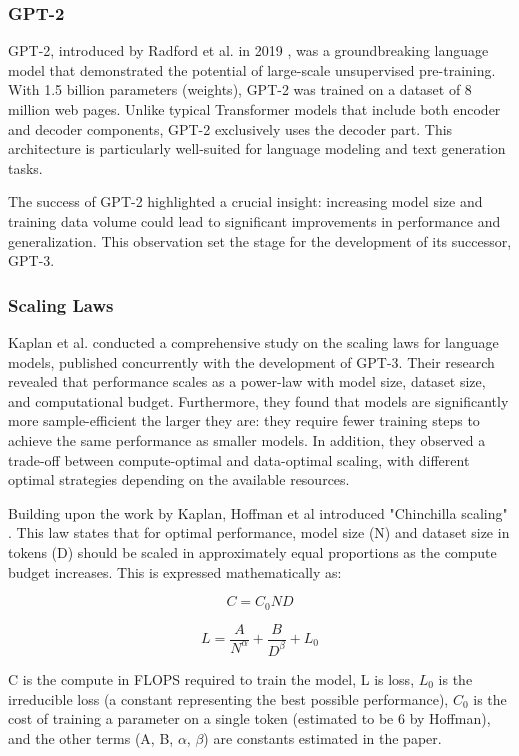 \documentclass[a4paper, oneside]{discothesis}
\begin{document}
\subsubsection{GPT-2}
GPT-2, introduced by Radford et al. in 2019 \cite{radford2019language}, was a groundbreaking language model that demonstrated the potential of large-scale unsupervised pre-training. With 1.5 billion parameters (weights), GPT-2 was trained on a dataset of 8 million web pages. Unlike typical Transformer models that include both encoder and decoder components, GPT-2 exclusively uses the decoder part. This architecture is particularly well-suited for language modeling and text generation tasks.

The success of GPT-2 highlighted a crucial insight: increasing model size and training data volume could lead to significant improvements in performance and generalization. This observation set the stage for the development of its successor, GPT-3.

\subsubsection{Scaling Laws}
Kaplan et al. \cite{kaplan2020scaling} conducted a comprehensive study on the scaling laws for language models, published concurrently with the development of GPT-3. Their research revealed that performance scales as a power-law with model size, dataset size, and computational budget. Furthermore, they found that models are significantly more sample-efficient the larger they are: they require fewer training steps to achieve the same performance as smaller models. In addition, they observed a trade-off between compute-optimal and data-optimal scaling, with different optimal strategies depending on the available resources.

Building upon the work by Kaplan, Hoffman et al introduced "Chinchilla scaling" \cite{hoffmann2022training}. This law states that for optimal performance, model size (N) and dataset size in tokens (D) should be scaled in approximately equal proportions as the compute budget increases. This is expressed mathematically as:

\begin{equation}
C = C_0ND
\end{equation}

\begin{equation}
L = \frac{A}{N^\alpha} + \frac{B}{D^\beta} + L_0
\end{equation}

C is the compute in FLOPS required to train the model, L is loss, $L_0$ is the irreducible loss (a constant representing the best possible performance), $C_0$ is the cost of training a parameter on a single token (estimated to be 6 by Hoffman), and the other terms (A, B, $\alpha$, $\beta$) are constants estimated in the paper.
\end{document}
